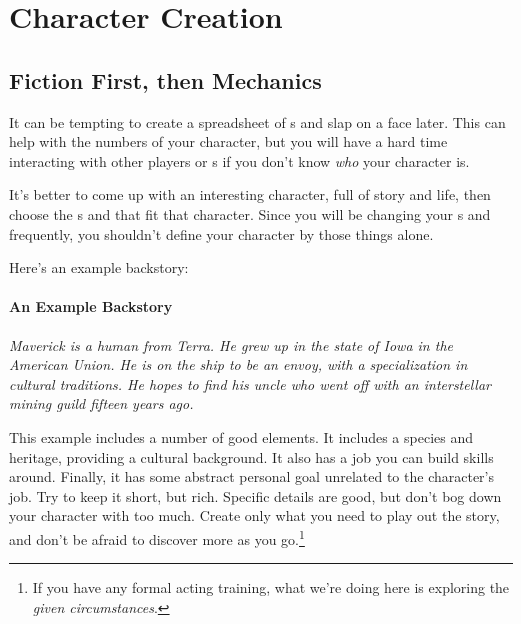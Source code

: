 \hypertarget{Character Creation}{}
\section{Character Creation}

\subsection{Fiction First, then Mechanics}

\par
It can be tempting to create a spreadsheet of \skill s and slap on a face later. This can help with the numbers of your character, but you will have a hard time interacting with other players or \npc s if you don't know \textit{who} your character is.

\par
It's better to come up with an interesting character, full of story and life, then choose the \skill s and \abilityP that fit that character. Since you will be changing your \skill s and \abilityP frequently, you shouldn't define your character by those things alone.

\par
Here's an example backstory:

\paragraph{An Example Backstory}
\textit{Maverick is a human from Terra. He grew up in the state of Iowa in the American Union. He is on the ship to be an envoy, with a specialization in cultural traditions. He hopes to find his uncle who went off with an interstellar mining guild fifteen years ago.}

\par
This example includes a number of good elements. It includes a species and heritage, providing a cultural background. It also has a job you can build skills around. Finally, it has some abstract personal goal unrelated to the character's job. Try to keep it short, but rich. Specific details are good, but don't bog down your character with too much. Create only what you need to play out the story, and don't be afraid to discover more as you go.\footnote{If you have any formal acting training, what we're doing here is exploring the \textit{given circumstances}.}

\par
